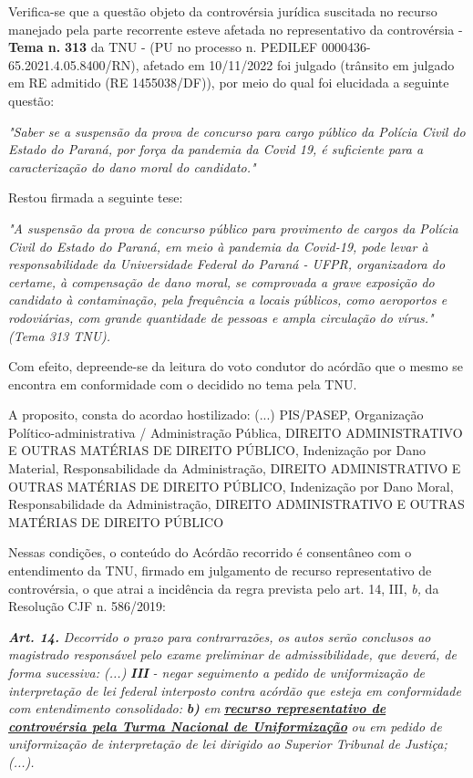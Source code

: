 \documentclass[12pt]{article}
\begin{document}
\justifying
\noindent Verifica-se que a questão objeto da controvérsia jurídica suscitada no recurso manejado pela parte recorrente esteve afetada no representativo da controvérsia - \textbf{Tema n. }\textbf{313} da TNU - (PU no processo n. PEDILEF 0000436-65.2021.4.05.8400/RN),  afetado em 10/11/2022 foi julgado (trânsito em julgado em RE admitido (RE 1455038/DF)), por meio do qual foi elucidada a seguinte questão:

\noindent \textit{"Saber se a suspensão da prova de concurso para cargo público da Polícia Civil do Estado do Paraná, por força da pandemia da Covid 19, é suficiente para a caracterização do dano moral do candidato."}

\noindent Restou firmada a seguinte tese:

\noindent \textit{"A suspensão da prova de concurso público para provimento de cargos da Polícia Civil do Estado do Paraná, em meio à pandemia da Covid-19, pode levar à responsabilidade da Universidade Federal do Paraná - UFPR, organizadora do certame, à compensação de dano moral, se comprovada a grave exposição do candidato à contaminação, pela frequência a locais públicos, como aeroportos e rodoviárias, com grande quantidade de pessoas e ampla circulação do vírus." (Tema 313 TNU).}

\noindent Com efeito, depreende-se da leitura do voto condutor do acórdão que o mesmo se encontra em conformidade com o decidido no  tema pela TNU.

\noindent A proposito, consta do acordao hostilizado: (...) PIS/PASEP, Organização Político-administrativa / Administração Pública, DIREITO ADMINISTRATIVO E OUTRAS MATÉRIAS DE DIREITO PÚBLICO, Indenização por Dano Material, Responsabilidade da Administração, DIREITO ADMINISTRATIVO E OUTRAS MATÉRIAS DE DIREITO PÚBLICO, Indenização por Dano Moral, Responsabilidade da Administração, DIREITO ADMINISTRATIVO E OUTRAS MATÉRIAS DE DIREITO PÚBLICO

\noindent Nessas condições, o conteúdo do Acórdão recorrido é consentâneo com o entendimento da TNU, firmado em julgamento de recurso representativo de controvérsia, o que atrai a incidência da regra prevista pelo art. 14, III, \textit{b,} da Resolução CJF n. 586/2019:

\noindent \textit{\textbf{Art. 14.}}\textit{ Decorrido o prazo para contrarrazões, os autos serão conclusos ao magistrado responsável pelo exame preliminar de admissibilidade, que deverá, de forma sucessiva: (...) }\textit{\textbf{III }}\textit{- negar seguimento a pedido de uniformização de interpretação de lei federal interposto contra acórdão que esteja em conformidade com entendimento consolidado: }\textit{\textbf{b)}}\textit{ em }\uline{\textit{\textbf{recurso representativo de controvérsia pela Turma Nacional de Uniformização}}}\textit{ ou em pedido de uniformização de interpretação de lei dirigido ao Superior Tribunal de Justiça;(...).}
\end{document}
